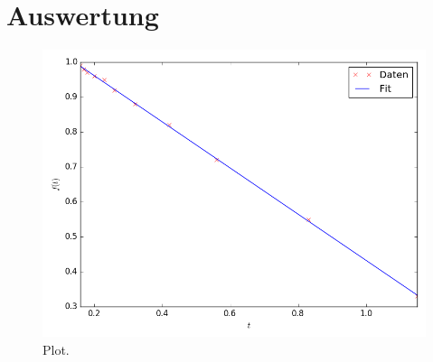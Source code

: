 \section{Auswertung}
\label{sec:Auswertung}

\begin{figure}
  \centering
  \includegraphics{Sinus.png}
  \caption{Plot.}
  \label{fig:plot}
\end{figure}

 